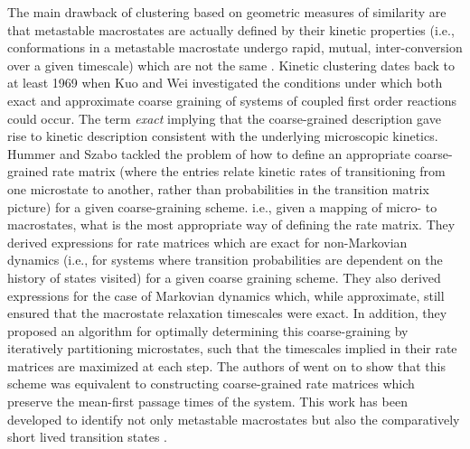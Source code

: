 \begin{highlighted}
The main drawback of clustering based on geometric measures of similarity are that metastable macrostates are actually defined by their kinetic properties (i.e., conformations in a metastable macrostate undergo rapid, mutual, inter-conversion over a given timescale) which are not the same \cite{schutteDirectApproachConformational1999}. Kinetic clustering dates back to at least 1969 when Kuo and Wei \cite{weiLumpingAnalysisMonomolecular1969, kuoLumpingAnalysisMonomolecular} investigated the conditions under which both exact and approximate coarse graining of systems of coupled first order reactions could occur. The term \emph{exact} implying that the coarse-grained description gave rise to kinetic description consistent with the underlying microscopic kinetics.  Hummer and Szabo \cite{hummerOptimalDimensionalityReduction2015a} tackled the problem of how to define an appropriate coarse-grained rate matrix (where the entries relate kinetic rates of transitioning from one microstate to another, rather than probabilities in the transition matrix picture) for a given coarse-graining scheme. i.e., given a mapping of micro- to macrostates, what is the most appropriate way of defining the rate matrix.  They derived expressions for rate matrices which are exact for non-Markovian dynamics (i.e., for systems where transition probabilities are dependent on the history of states visited) for a given coarse graining scheme.  They also derived expressions for the case of Markovian dynamics which, while approximate, still ensured that the macrostate relaxation timescales were exact. In addition, they proposed an algorithm for optimally determining this coarse-graining by iteratively partitioning microstates, such that the timescales implied in their rate matrices are maximized at each step. The authors of \cite{kellsCorrelationFunctionsMean2020} went on to show that this scheme was equivalent to constructing coarse-grained rate matrices which preserve the mean-first passage times of the system. This work has been developed to identify not only metastable macrostates but also the comparatively short lived transition states \cite{martiniVariationalIdentificationMarkovian2017}. 


\end{highlighted}
